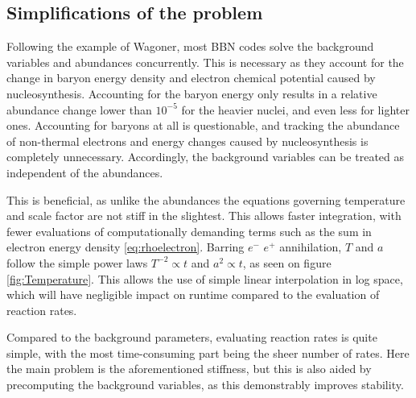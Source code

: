 \subsection{Simplifications of the problem}
Following the example of Wagoner, most BBN codes solve the background variables and abundances concurrently. This is necessary as they account for the change in baryon energy density and electron chemical potential caused by nucleosynthesis. Accounting for the baryon energy only results in a relative abundance change lower than $10^{-5}$ for the heavier nuclei, and even less for lighter ones. Accounting for baryons at all is questionable, and tracking the abundance of non-thermal electrons and energy changes caused by nucleosynthesis is completely unnecessary. Accordingly, the background variables can be treated as independent of the abundances.

This is beneficial, as unlike the abundances the equations governing temperature and scale factor are not stiff in the slightest. This allows faster integration, with fewer evaluations of computationally demanding terms such as the sum in electron energy density \eqref{eq:rhoelectron}. Barring $e^-$ $e^+$ annihilation, $T$ and $a$ follow the simple power laws $T^{-2}\propto t$ and $a^2\propto t$, as seen on figure \ref{fig:Temperature}. This allows the use of simple linear interpolation in log space, which will have negligible impact on runtime compared to the evaluation of reaction rates.

Compared to the background parameters, evaluating reaction rates is quite simple, with the most time-consuming part being the sheer number of rates. Here the main problem is the aforementioned stiffness, but this is also aided by precomputing the background variables, as this demonstrably improves stability.


